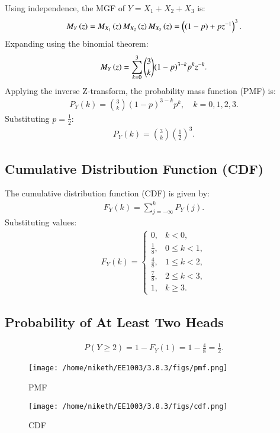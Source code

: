\documentclass[journal]{IEEEtran}
\begin{document}
Using independence, the MGF of $Y = X_1 + X_2 + X_3$ is:
\begin{align}
M_Y\left(z\right) = M_{X_1}\left(z\right) M_{X_2}\left(z\right) M_{X_3}\left(z\right) = \left((1 - p) + pz^{-1}\right)^3.
\end{align}
Expanding using the binomial theorem:
\begin{align}
M_Y\left(z\right) = \sum_{k=0}^{3} \binom{3}{k} (1 - p)^{3-k} p^k z^{-k}.
\end{align}
Applying the inverse Z-transform, the probability mass function (PMF) is:
\begin{align}
P_Y(k) = \binom{3}{k} (1 - p)^{3-k} p^k, \quad k = 0, 1, 2, 3.
\end{align}
Substituting $p = \frac{1}{2}$:
\begin{align}
P_Y(k) = \binom{3}{k} \left(\frac{1}{2}\right)^3.
\end{align}

\subsection{Cumulative Distribution Function (CDF)}
The cumulative distribution function (CDF) is given by:
\begin{align}
F_Y(k) = \sum_{j=-\infty}^{k} P_Y(j).
\end{align}
Substituting values:
\begin{align}
F_Y(k) =
\begin{cases}
0, & k < 0, \\
\frac{1}{8}, & 0 \leq k < 1, \\
\frac{4}{8}, & 1 \leq k < 2, \\
\frac{7}{8}, & 2 \leq k < 3, \\
1, & k \geq 3.
\end{cases}
\end{align}

\subsection{Probability of At Least Two Heads}
\begin{align}
P(Y \geq 2) = 1 - F_Y(1) = 1 - \frac{4}{8} = \frac{1}{2}.
\end{align}

\begin{figure}[!ht]
    \centering
    \texttt{[image: /home/niketh/EE1003/3.8.3/figs/pmf.png]}
    \caption{PMF}
\end{figure}
\begin{figure}[!ht]
    \centering
    \texttt{[image: /home/niketh/EE1003/3.8.3/figs/cdf.png]}
    \caption{CDF}
\end{figure}
\end{document}
